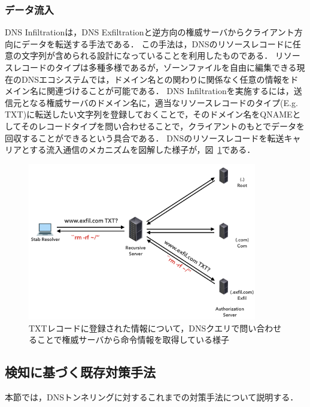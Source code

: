 
\subsubsection{データ流入}
\label{sec:dns-infiltration}
DNS Infiltrationは，DNS Exfiltrationと逆方向の権威サーバからクライアント方向にデータを転送する手法である．
この手法は，DNSのリソースレコードに任意の文字列が含められる設計になっていることを利用したものである．
リソースレコードのタイプは多種多様であるが，ゾーンファイルを自由に編集できる現在のDNSエコシステムでは，ドメイン名との関わりに関係なく任意の情報をドメイン名に関連づけることが可能である．
DNS Infiltrationを実施するには，送信元となる権威サーバのドメイン名に，適当なリソースレコードのタイプ(E.g. TXT)に転送したい文字列を登録しておくことで，そのドメイン名をQNAMEとしてそのレコードタイプを問い合わせることで，クライアントのもとでデータを回収することができるという具合である．
DNSのリソースレコードを転送キャリアとする流入通信のメカニズムを図解した様子が，図~\ref{fig:dns-infiltration}である．

\begin{figure}[h]
 \centering
 \includegraphics[width=10.0cm]{figure/dns-infiltration.png}
 \caption{TXTレコードに登録された情報について，DNSクエリで問い合わせることで権威サーバから命令情報を取得している様子}
 \label{fig:dns-infiltration}
\end{figure}


\subsection{検知に基づく既存対策手法}
本節では，DNSトンネリングに対するこれまでの対策手法について説明する．
